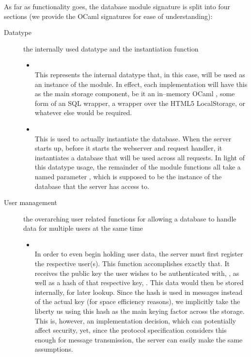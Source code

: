 As far as functionality goes, the database module signature is split into four sections (we provide the OCaml signatures for ease of understanding):
\begin{description}
  \item[Datatype] the internally used datatype and the instantiation function
  \begin{itemize}
    \item {} \\
    This represents the internal datatype that, in this case, will be used as an instance of the module.
    In effect, each implementation will have this as the main storage component, be it an in--memory OCaml , some form of an SQL wrapper, a wrapper over the HTML5 LocalStorage, or whatever else would be required.
    \item {} \\
    This is used to actually instantiate the database.
    When the server starts up, before it starts the webserver and request handler, it instantiates a database that will be used across all requests.
    In light of this datatype usage, the remainder of the module functions all take a named parameter , which is supposed to be the instance of the database that the server has access to.
  \end{itemize}

  \item[User management] the overarching user related functions for allowing a database to handle data for multiple users at the same time
  \begin{itemize}
  \item {} \\
  In order to even begin holding user data, the server must first register the respective user(s).
  This function accomplishes exactly that.
  It receives the public key the user wishes to be authenticated with, , as well as a hash of that respective key, .
  This data would then be stored internally, for later lookup.
  Since the hash is used in messages instead of the actual key (for space efficiency reasons), we implicitly take the liberty us using this hash as the main keying factor across the storage.
  This is, however, an implementation decision, which can potentially affect security, yet, since the protocol specification considers this enough for message transmission, the server can easily make the same assumptions.


\end{itemize}
\end{description}
